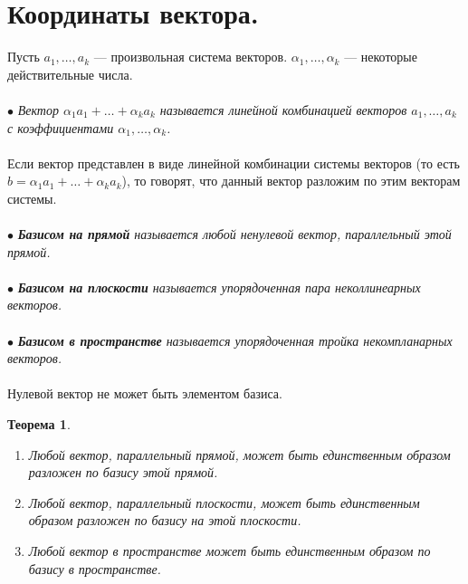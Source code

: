 \section{Координаты вектора.}
Пусть $a_1,\dots,a_k$ --- произвольная система векторов. $\alpha_1,\dots,\alpha_k$ --- некоторые действительные числа.\\\\
$\bullet$ \textit{Вектор $\alpha_1 a_1 + \ldots + \alpha_k a_k$ называется линейной комбинацией векторов $a_1,\dots,a_k$ с коэффициентами $\alpha_1,\dots,\alpha_k$.}\\\\
Если вектор представлен в виде линейной комбинации системы векторов (то есть $b = \alpha_1 a_1 + \ldots + \alpha_k a_k$), то говорят, что данный вектор разложим по этим векторам системы.\\\\
$\bullet$ \textit{\textbf{Базисом на прямой} называется любой ненулевой вектор, параллельный этой прямой.}\\\\
$\bullet$ \textit{\textbf{Базисом на плоскости} называется упорядоченная пара неколлинеарных векторов.}\\\\
$\bullet$ \textit{\textbf{Базисом в пространстве} называется упорядоченная тройка некомпланарных векторов.}\\\\
Нулевой вектор не может быть элементом базиса.
\newtheorem*{th2_2_1}{Теорема}\begin{th2_2_1}\end{th2_2_1}
\begin{enumerate}
	\item \textit{Любой вектор, параллельный прямой, может быть единственным образом разложен по базису этой прямой.}
	\item \textit{Любой вектор, параллельный плоскости, может быть единственным образом разложен по базису на этой плоскости.}
	\item \textit{Любой вектор в пространстве может быть единственным образом по базису в пространстве.}
\end{enumerate}
